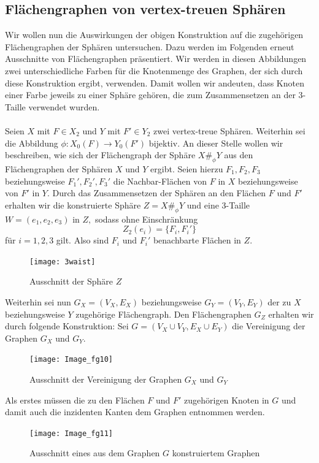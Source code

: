 \documentclass[12pt,titlepage,twoside,cleardoublepage]{article}
\theoremstyle{nummermitklammern}
\numberwithin{equation}{section}
\begin{document}
\subsection{Flächengraphen von vertex-treuen Sphären}
Wir wollen nun die Auswirkungen der obigen Konstruktion auf die zugehörigen Flächengraphen der Sphären untersuchen.
Dazu werden im Folgenden erneut Ausschnitte von Flächengraphen präsentiert. Wir werden in diesen Abbildungen zwei unterschiedliche Farben für die Knotenmenge des Graphen, der sich durch diese Konstruktion ergibt, verwenden. Damit wollen wir andeuten, dass Knoten einer Farbe jeweils zu einer Sphäre gehören, die zum Zusammensetzen an der 3-Taille verwendet wurden.\\\\
Seien $X$ mit $F\in X_2$ und $Y$ mit $F'\in Y_2$ zwei vertex-treue Sphären. Weiterhin sei die Abbildung $\phi:X_0(F)\to Y_0(F')$ bijektiv. An dieser Stelle wollen wir beschreiben, wie sich der Flächengraph der Sphäre $X\#_{\phi}Y$ aus den Flächengraphen der Sphären $X$ und $Y$ ergibt. Seien hierzu $F_1,F_2,F_3$ beziehungsweise $F_1',F_2',F_3'$ die Nachbar-Flächen von $F$ in $X$ beziehungsweise von $F'$ in $Y.$ Durch das Zusammensetzen der Sphären an den Flächen $F$ und $F'$ erhalten wir die konstruierte Sphäre $Z=X \#_\phi Y$ und eine 3-Taille $W=(e_1,e_2,e_3)$ in $Z,$ sodass ohne Einschränkung 
\[
Z_2(e_i)=\{F_i,F_i'\}
\] für $i=1,2,3$ gilt. Also sind $F_i$ und $F_i'$ benachbarte Flächen in $Z$.
\begin{figure}[H]
\begin{center}
\texttt{[image: 3waist]}
\end{center}
\caption{Ausschnitt der Sphäre $Z$}
\end{figure}   
 Weiterhin sei nun $G_X=(V_X,E_X)$ beziehungsweise $G_Y=(V_Y,E_Y)$ der zu $X$ beziehungsweise $Y$ zugehörige Flächengraph. Den Flächengraphen $G_Z$ erhalten wir durch folgende Konstruktion:
Sei $G=(V_X\cup V_Y,E_X \cup E_Y)$ die Vereinigung der Graphen $G_X$ und $G_Y.$
\begin{figure}[H]
\begin{center}
\texttt{[image: Image\_fg10]}
\end{center}
\caption{Ausschnitt der Vereinigung der Graphen $G_X$ und $G_Y$}
\end{figure}
Als erstes müssen die zu den Flächen $F$ und $F'$ zugehörigen Knoten in $G$ und damit auch die inzidenten Kanten dem Graphen entnommen werden. 
\begin{figure}[H]
\begin{center}
\texttt{[image: Image\_fg11]}
\end{center}
\caption{Ausschnitt eines aus dem Graphen $G$ konstruiertem Graphen}
\end{figure}
\end{document}
